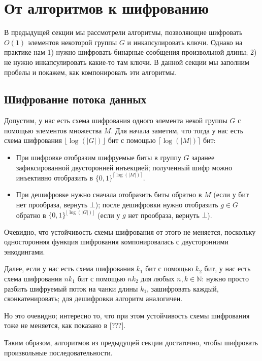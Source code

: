 \documentclass[a4paper,14pt]{extarticle}
\begin{document}
\newpage

\section{От алгоритмов к шифрованию}

В предыдущей секции мы рассмотрели алгоритмы, позволяющие шифровать $O(1)$
элементов некоторой группы $G$ и инкапсулировать ключи. Однако на практике нам
1) нужно шифровать бинарные сообщения произвольной длины; 2) не нужно
инкапсулировать какие-то там ключи. В данной секции мы заполним пробелы и
покажем, как компонировать эти алгоритмы.

\subsection{Шифрование потока данных}

Допустим, у нас есть схема шифрования одного элемента некой группы $G$ с помощью
элементов множества $M$. Для начала заметим, что тогда у нас есть схема
шифрования $\lfloor \log(|G|) \rfloor$ бит с помощью $\lceil \log(|M|) \rceil$
бит:

\begin{itemize}
    \item При шифровке отобразим шифруемые биты в группу $G$ заранее
        зафиксированной двусторонней инъекцией; полученный шифр можно инъективно
        отобразить в $\{0, 1\}^{\lceil \log(|M|) \rceil}$.
    \item При дешифровке нужно сначала отобразить биты обратно в $M$ (если у бит
        нет прообраза, вернуть $\bot$); после дешифровки нужно отобразить
        $g \in G$ обратно в $\{0, 1\}^{\lfloor \log(|G|) \rfloor}$ (если у $g$
        нет прообраза, вернуть $\bot$).
\end{itemize}

Очевидно, что устойчивость схемы шифрования от этого не меняется, поскольку
односторонняя функция шифрования компонировалась с двусторонними энкодингами.

Далее, если у нас есть схема шифрования $k_1$ бит с помощью $k_2$ бит, у нас
есть схема шифрования $n k_1$ бит с помощью $n k_2$ для любых
$n, k \in \mathbb{N}$: нужно просто разбить шифруемый поток на чанки длины
$k_1$, зашифровать каждый, сконкатенировать; для дешифровки алгоритм аналогичен.

Но это очевидно; интересно то, что при этом устойчивость схемы шифрования тоже
не меняется, как показано в [???].

Таким образом, алгоритмов из предыдущей секции достаточно, чтобы шифровать
произвольные последовательности.
\end{document}
